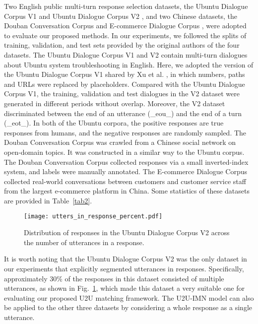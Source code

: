 \documentclass[journal]{IEEEtran}
\begin{document}
    Two English public multi-turn response selection datasets, the Ubuntu Dialogue Corpus V1 \cite{DBLP:conf/sigdial/LowePSP15} and Ubuntu Dialogue Corpus V2 \cite{DBLP:journals/dad/LowePSCLP17}, and two Chinese datasets, the Douban Conversation Corpus \cite{DBLP:conf/acl/WuWXZL17} and E-commerce Dialogue Corpus \cite{DBLP:conf/coling/ZhangLZZL18}, were adopted to evaluate our proposed methods.
    In our experiments, we followed the splits of training, validation, and test sets provided by the original authors of the four datasets.
    The Ubuntu Dialogue Corpus V1 and V2 contain multi-turn dialogues about Ubuntu system troubleshooting in English. Here, we adopted the version of the Ubuntu Dialogue Corpus V1 shared by Xu et al. \cite{DBLP:journals/corr/XuLWSW16}, in which numbers, paths and URLs were replaced by placeholders. Compared with the Ubuntu Dialogue Corpus V1, the training, validation and test dialogues in the V2 dataset were generated in different periods without overlap. Moreover, the V2 dataset discriminated between the end of an utterance (\_eou\_) and the end of a turn (\_eot\_). In both of the Ubuntu corpora, the positive responses are true responses from humans, and the negative responses are randomly sampled. The Douban Conversation Corpus was crawled from a Chinese social network on open-domain topics. It was constructed in a similar way to the Ubuntu corpus. The Douban Conversation Corpus collected responses via a small inverted-index system, and labels were manually annotated. The E-commerce Dialogue Corpus collected real-world conversations between customers and customer service staff from the largest e-commerce platform in China.
    Some statistics of these datasets are provided in Table~\ref{tab2}.

    \begin{figure}
    \centering
    \texttt{[image: utters\_in\_response\_percent.pdf]}
    \caption{Distribution of responses in the Ubuntu Dialogue Corpus V2 across the number of utterances in a response.}
    \label{fig3}
    \end{figure}

    It is worth noting that the Ubuntu Dialogue Corpus V2 was the only dataset in our experiments that explicitly segmented utterances in responses. Specifically, approximately 30\% of the responses in this dataset consisted of multiple utterances, as shown in Fig.~\ref{fig3}, which made this dataset a very suitable one for evaluating our proposed U2U matching framework. The U2U-IMN model can also be applied to the other three datasets by considering a whole response as a single utterance.
\end{document}
